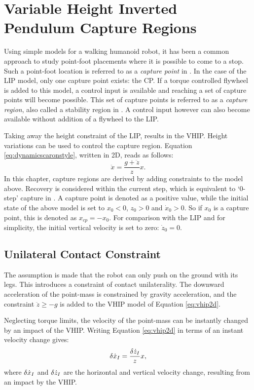 %
\chapter{Variable Height Inverted Pendulum Capture Regions}\label{chap:regions}
Using simple models for a walking humanoid robot, it has been a common approach to study point-foot placements where it is possible to come to a stop. Such a point-foot location is referred to as a \textit{capture point} in \cite{pratt2006capture}. In the case of the \ac{LIP} model, only one capture point exists: the \ac{CP}. If a torque controlled flywheel is added to this model, a control input is available and reaching a set of capture points will become possible. This set of capture points is referred to as a \textit{capture region}, also called a stability region in \cite{stephens2007humanoid}. A control input however can also become available without addition of a flywheel to the \ac{LIP}.


Taking away the height constraint of the \ac{LIP}, results in the \ac{VHIP}. Height variations can be used to control the capture region. Equation \eqref{eq:dynamicscaronstyle}, written in \ac{2D}, reads as follows:
\begin{equation}
	\label{eq:vhip2d}
	\ddot{x}=\frac{g+\ddot{z}}{z}x.
\end{equation}	
In this chapter, capture regions are derived by adding constraints to the model above. Recovery is considered within the current step, which is equivalent to `0-step' capture in \cite{koolen2012capturability}. A capture point is denoted as a positive value, while the initial state of the above model is set to $x_0<0$, $z_0>0$ and $\dot{x}_0>0$. So if $x_0$ is a capture point, this is denoted as $x_{cp}=-x_0$. For comparison with the \ac{LIP} and for simplicity, the initial vertical velocity is set to zero: $\dot{z}_0=0$.



\section{Unilateral Contact Constraint}
The assumption is made that the robot can only push on the ground with its legs. This introduces a constraint of contact unilaterality. The downward acceleration of the point-mass is constrained by gravity acceleration, and the constraint $\ddot{z} \geq -g$ is added to the \ac{VHIP} model of Equation \eqref{eq:vhip2d}.

Neglecting torque limits, the velocity of the point-mass can be instantly changed by an impact of the \ac{VHIP}. Writing Equation \eqref{eq:vhip2d} in terms of an instant velocity change gives:
\begin{equation}
	\label{eq:vhipi}
	\delta \dot{x}_I=\frac{\delta \dot{z}_I}{z}x,
\end{equation}	
where $\delta \dot{x}_I$ and $\delta \dot{z}_I$ are the horizontal and vertical velocity change, resulting from an impact by the \ac{VHIP}.

